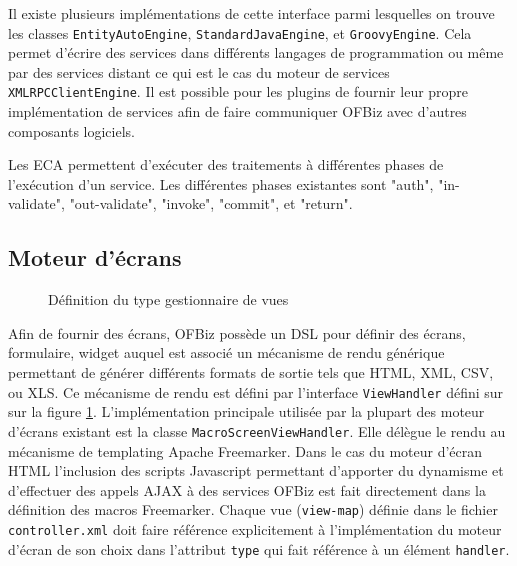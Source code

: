 \documentclass[a4paper, 11pt]{report}
\begin{document}
Il existe plusieurs implémentations de cette interface parmi
lesquelles on trouve les classes \texttt{EntityAutoEngine},
\texttt{StandardJavaEngine}, et \texttt{GroovyEngine}. Cela permet
d'écrire des services dans différents langages de programmation ou
même par des services distant ce qui est le cas du moteur de services
\verb=XMLRPCClientEngine=. Il est possible pour les plugins de fournir
leur propre implémentation de services afin de faire communiquer
OFBiz avec d'autres composants logiciels.

Les ECA permettent d'exécuter des traitements à différentes phases de
l'exécution d'un service. Les différentes phases existantes sont
"auth", "in-validate", "out-validate", "invoke", "commit", et
"return".

\subsection{Moteur d'écrans}

\begin{figure}
  \centering
  \caption{Définition du type gestionnaire de vues}
  \label{fig:viewhandler}
\end{figure}

Afin de fournir des écrans, OFBiz possède un DSL pour définir des
écrans, formulaire, widget auquel est associé un mécanisme de rendu
générique permettant de générer différents formats de sortie tels que
HTML, XML, CSV, ou XLS. Ce mécanisme de rendu est défini par
l'interface \verb=ViewHandler= défini sur sur la figure
\ref{fig:viewhandler}. L'implémentation principale utilisée par la
plupart des moteur d'écrans existant est la classe
\verb=MacroScreenViewHandler=. Elle délègue le rendu au mécanisme de
templating Apache Freemarker. Dans le cas du moteur d'écran HTML
l'inclusion des scripts Javascript permettant d'apporter du dynamisme
et d'effectuer des appels AJAX \cite{garrett2005ajax} à des services
OFBiz est fait directement dans la définition des macros Freemarker.
Chaque vue (\verb=view-map=) définie dans le fichier
\verb=controller.xml= doit faire référence explicitement à
l'implémentation du moteur d'écran de son choix dans l'attribut
\verb=type= qui fait référence à un élément \verb=handler=.
\end{document}
